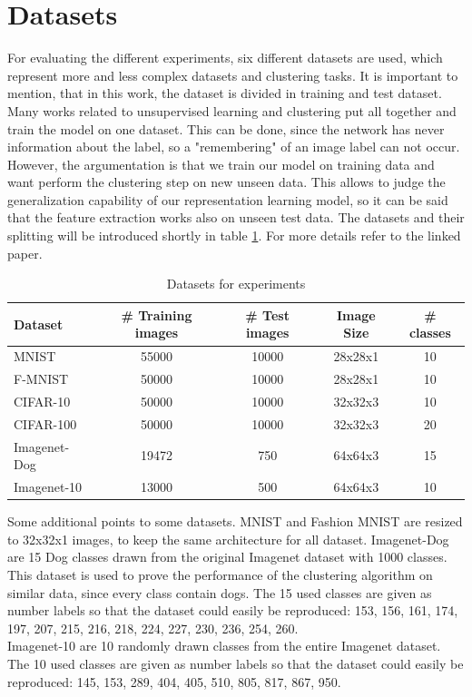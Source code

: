 \documentclass[12pt,DIV14,BCOR12mm,a4paper,footexclude,headinclude,halfparskip-,twoside,openright,cleardoubleempty,idxtotoc,bibtotoc,listtotoc]{scrreprt} %
\numberwithin{equation}{chapter}
\begin{document}
\section{Datasets}
For evaluating the different experiments, six different datasets are used, which represent more and less complex datasets and clustering tasks. It is important to mention, that in this work, the dataset is divided in training and test dataset. Many works related to unsupervised learning and clustering put all together and train the model on one dataset. This can be done, since the network has never information about the label, so a "remembering" of an image label can not occur. However, the argumentation is that we train our model on training data and want perform the clustering step on new unseen data. This allows to judge the generalization capability of our representation learning model, so it can be said that the feature extraction works also on unseen test data. The datasets and their splitting will be introduced shortly in table \ref{tab:Datasets}. For more details refer to the linked paper.
\begin{table}[htb!]
    \centering
    \caption{Datasets for experiments}
    \label{tab:Datasets}
    \begin{tabular}{lcccc}
        \toprule
        Dataset & \# Training images & \# Test images & Image Size & \# classes\\
        \midrule
        MNIST \cite{MNIST-Data} & 55000 & 10000 & 28x28x1 & 10\\
        F-MNIST \cite{xiao17F-MNIST} & 50000 & 10000 & 28x28x1 & 10\\
        CIFAR-10 \cite{Krizhevsky09CIFAR} & 50000 & 10000 & 32x32x3 & 10\\
        CIFAR-100 \cite{Krizhevsky09CIFAR} & 50000 & 10000 & 32x32x3 & 20\\
        Imagenet-Dog \cite{imagenet_cvpr09} & 19472 & 750 & 64x64x3 & 15\\
        Imagenet-10 \cite{imagenet_cvpr09} & 13000 & 500 & 64x64x3 & 10\\
        \bottomrule
    \end{tabular}
\end{table}
Some additional points to some datasets. MNIST and Fashion MNIST are resized to 32x32x1 images, to keep the same architecture for all dataset. Imagenet-Dog are  15 Dog classes drawn from the original Imagenet dataset with 1000 classes. This dataset is used to prove the performance of the clustering algorithm on similar data, since every class contain dogs. The 15 used classes are given as number labels so that the dataset could easily be reproduced: 153, 156, 161, 174, 197, 207, 215, 216, 218, 224, 227, 230, 236, 254, 260.\\
Imagenet-10 are 10 randomly drawn classes from the entire Imagenet dataset. The 10 used classes are given as number labels so that the dataset could easily be reproduced: 145, 153, 289, 404, 405, 510, 805, 817, 867, 950.
\end{document}
